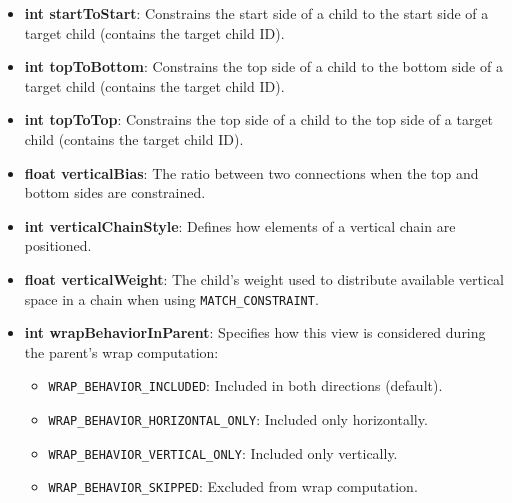 \documentclass{report}
\begin{document}
\begin{itemize}
\begin{itemize}
                \item \textbf{int startToStart}: Constrains the start side of a child to the start side of a target child (contains the target child ID).
                \item \textbf{int topToBottom}: Constrains the top side of a child to the bottom side of a target child (contains the target child ID).
                \item \textbf{int topToTop}: Constrains the top side of a child to the top side of a target child (contains the target child ID).
                \item \textbf{float verticalBias}: The ratio between two connections when the top and bottom sides are constrained.
                \item \textbf{int verticalChainStyle}: Defines how elements of a vertical chain are positioned.
                \item \textbf{float verticalWeight}: The child’s weight used to distribute available vertical space in a chain when using \texttt{MATCH\_CONSTRAINT}.
                \item \textbf{int wrapBehaviorInParent}: Specifies how this view is considered during the parent's wrap computation:
                    \begin{itemize}
                        \item \texttt{WRAP\_BEHAVIOR\_INCLUDED}: Included in both directions (default).
                        \item \texttt{WRAP\_BEHAVIOR\_HORIZONTAL\_ONLY}: Included only horizontally.
                        \item \texttt{WRAP\_BEHAVIOR\_VERTICAL\_ONLY}: Included only vertically.
                        \item \texttt{WRAP\_BEHAVIOR\_SKIPPED}: Excluded from wrap computation.
                    \end{itemize}
            \end{itemize}


\end{itemize}
\end{document}
